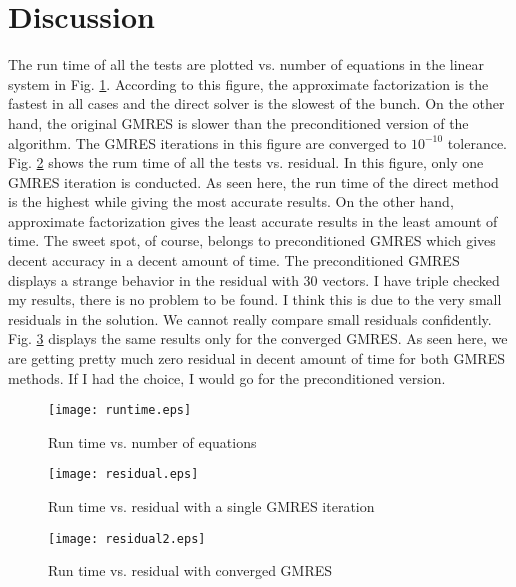 \documentclass{article}
\begin{document}
\section{Discussion}
The run time of all the tests are plotted vs. number of equations in the linear system in Fig. \ref{fig_discussion_1}. According to this figure, the approximate factorization is the fastest in all cases and the direct solver is the slowest of the bunch. On the other hand, the original GMRES is slower than the preconditioned version of the algorithm. The GMRES iterations in this figure are converged to $10^{-10}$ tolerance. Fig. \ref{fig_discussion_2} shows the rum time of all the tests vs. residual. In this figure, only one GMRES iteration is conducted. As seen here, the run time of the direct method is the highest while giving the most accurate results. On the other hand, approximate factorization gives the least accurate results in the least amount of time. The sweet spot, of course, belongs to preconditioned GMRES which gives decent accuracy in a decent amount of time. The preconditioned GMRES displays a strange behavior in the residual with 30 vectors. I have triple checked my results, there is no problem to be found. I think this is due to the very small residuals in the solution. We cannot really compare small residuals confidently.  Fig. \ref{fig_discussion_3} displays the same results only for the converged GMRES. As seen here, we are getting pretty much zero residual in decent amount of time for both GMRES methods. If I had the choice, I would go for the preconditioned version.

\begin{figure}[H]
\centering
\texttt{[image: runtime.eps]}
\caption{Run time vs. number of equations}
\label{fig_discussion_1}
\end{figure}

\begin{figure}[H]
\centering
\texttt{[image: residual.eps]}
\caption{Run time vs. residual with a single GMRES iteration}
\label{fig_discussion_2}
\end{figure}

\begin{figure}[H]
\centering
\texttt{[image: residual2.eps]}
\caption{Run time vs. residual with converged GMRES}
\label{fig_discussion_3}
\end{figure}
















\newpage


\end{document}
